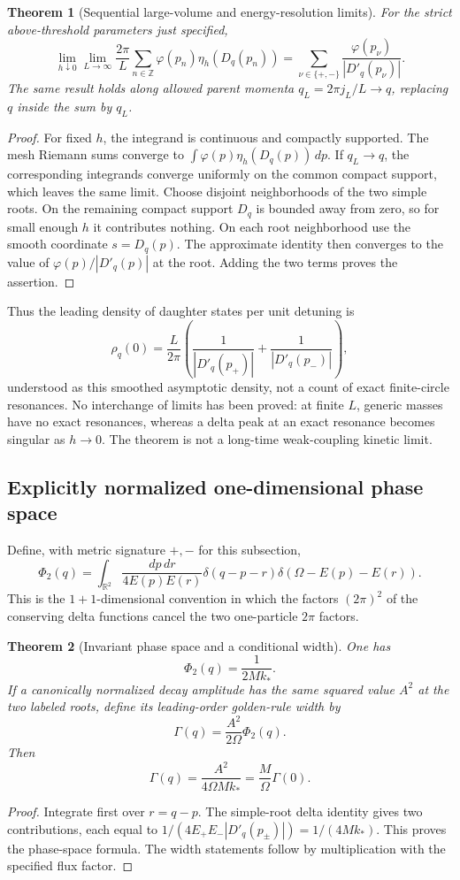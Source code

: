 \documentclass[11pt]{article}
\newtheorem{theorem}{Theorem}[section]
\theoremstyle{remark}
\begin{document}
\begin{theorem}[Sequential large-volume and energy-resolution limits]
\label{thm:v20v42-limit}
For the strict above-threshold parameters just specified,
\[
 \lim_{h\downarrow0}\lim_{L\to\infty}
 \frac{2\pi}{L}\sum_{n\in\mathbb Z}
 \varphi(p_n)\eta_h(D_q(p_n))
 =
 \sum_{\nu\in\{+,-\}}\frac{\varphi(p_\nu)}{|D'_q(p_\nu)|}.
\]
The same result holds along allowed parent momenta
\(q_L=2\pi j_L/L\to q\), replacing \(q\) inside the sum by \(q_L\).
\end{theorem}
\begin{proof}
For fixed \(h\), the integrand is continuous and compactly supported.
The mesh Riemann sums converge to
\(\int \varphi(p)\eta_h(D_q(p))\,dp\).  If \(q_L\to q\),
the corresponding integrands converge uniformly on the common
compact support, which leaves the same limit.
Choose disjoint neighborhoods of the two simple roots.  On the
remaining compact support \(D_q\) is bounded away from zero, so
for small enough \(h\) it contributes nothing.  On each root
neighborhood use the smooth coordinate \(s=D_q(p)\).
The approximate identity then converges to the value of
\(\varphi(p)/|D'_q(p)|\) at the root.  Adding the two terms proves
the assertion.
\end{proof}

Thus the leading density of daughter states per unit detuning is
\[
 \rho_q(0)=\frac{L}{2\pi}
 \left(\frac1{|D'_q(p_+)|}+\frac1{|D'_q(p_-)|}\right),
\]
understood as this smoothed asymptotic density, not a count of exact
finite-circle resonances.  No interchange of limits has been proved:
at finite \(L\), generic masses have no exact resonances, whereas
a delta peak at an exact resonance becomes singular as \(h\to0\).
The theorem is not a long-time weak-coupling kinetic limit.

\subsection{Explicitly normalized one-dimensional phase space}

Define, with metric signature \(+,-\) for this subsection,
\[
 \Phi_2(q)=\int_{\mathbb R^2}
 \frac{dp\,dr}{4E(p)E(r)}
 \delta(q-p-r)\delta(\Omega-E(p)-E(r)).
\]
This is the \(1+1\)-dimensional convention in which the factors
\((2\pi)^2\) of the conserving delta functions cancel the two
one-particle \(2\pi\) factors.

\begin{theorem}[Invariant phase space and a conditional width]
\label{thm:v20v42-width}
One has
\[
 \Phi_2(q)=\frac1{2Mk_*}.
\]
If a canonically normalized decay amplitude has the same squared
value \(A^2\) at the two labeled roots, define its leading-order
golden-rule width by
\[
 \Gamma(q)=\frac{A^2}{2\Omega}\Phi_2(q).
\]
Then
\[
 \Gamma(q)=\frac{A^2}{4\Omega M k_*}
 =\frac M\Omega\Gamma(0).
\]
\end{theorem}
\begin{proof}
Integrate first over \(r=q-p\).  The simple-root delta identity
gives two contributions, each equal to
\(1/(4E_+E_-|D'_q(p_\pm)|)=1/(4Mk_*)\).
This proves the phase-space formula.  The width statements follow
by multiplication with the specified flux factor.
\end{proof}
\end{document}

